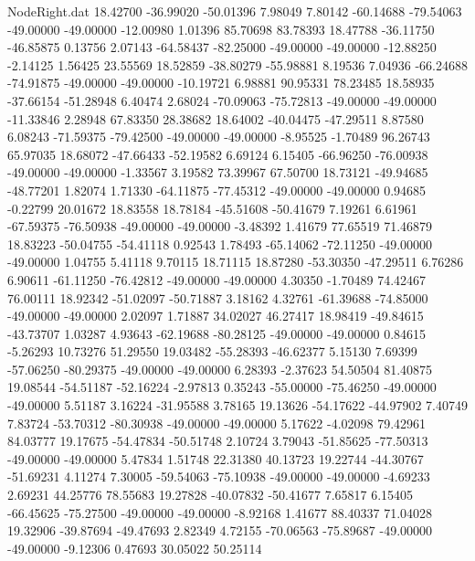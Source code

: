 \begin{filecontents}{NodeRight.dat}
  18.42700  -36.99020  -50.01396     7.98049    7.80142  -60.14688  -79.54063  -49.00000  -49.00000  -12.00980    1.01396   85.70698   83.78393
  18.47788  -36.11750  -46.85875     0.13756    2.07143  -64.58437  -82.25000  -49.00000  -49.00000  -12.88250   -2.14125    1.56425   23.55569
  18.52859  -38.80279  -55.98881     8.19536    7.04936  -66.24688  -74.91875  -49.00000  -49.00000  -10.19721    6.98881   90.95331   78.23485
  18.58935  -37.66154  -51.28948     6.40474    2.68024  -70.09063  -75.72813  -49.00000  -49.00000  -11.33846    2.28948   67.83350   28.38682
  18.64002  -40.04475  -47.29511     8.87580    6.08243  -71.59375  -79.42500  -49.00000  -49.00000   -8.95525   -1.70489   96.26743   65.97035
  18.68072  -47.66433  -52.19582     6.69124    6.15405  -66.96250  -76.00938  -49.00000  -49.00000   -1.33567    3.19582   73.39967   67.50700
  18.73121  -49.94685  -48.77201     1.82074    1.71330  -64.11875  -77.45312  -49.00000  -49.00000    0.94685   -0.22799   20.01672   18.83558
  18.78184  -45.51608  -50.41679     7.19261    6.61961  -67.59375  -76.50938  -49.00000  -49.00000   -3.48392    1.41679   77.65519   71.46879
  18.83223  -50.04755  -54.41118     0.92543    1.78493  -65.14062  -72.11250  -49.00000  -49.00000    1.04755    5.41118    9.70115   18.71115
  18.87280  -53.30350  -47.29511     6.76286    6.90611  -61.11250  -76.42812  -49.00000  -49.00000    4.30350   -1.70489   74.42467   76.00111
  18.92342  -51.02097  -50.71887     3.18162    4.32761  -61.39688  -74.85000  -49.00000  -49.00000    2.02097    1.71887   34.02027   46.27417
  18.98419  -49.84615  -43.73707     1.03287    4.93643  -62.19688  -80.28125  -49.00000  -49.00000    0.84615   -5.26293   10.73276   51.29550
  19.03482  -55.28393  -46.62377     5.15130    7.69399  -57.06250  -80.29375  -49.00000  -49.00000    6.28393   -2.37623   54.50504   81.40875
  19.08544  -54.51187  -52.16224    -2.97813    0.35243  -55.00000  -75.46250  -49.00000  -49.00000    5.51187    3.16224  -31.95588    3.78165
  19.13626  -54.17622  -44.97902     7.40749    7.83724  -53.70312  -80.30938  -49.00000  -49.00000    5.17622   -4.02098   79.42961   84.03777
  19.17675  -54.47834  -50.51748     2.10724    3.79043  -51.85625  -77.50313  -49.00000  -49.00000    5.47834    1.51748   22.31380   40.13723
  19.22744  -44.30767  -51.69231     4.11274    7.30005  -59.54063  -75.10938  -49.00000  -49.00000   -4.69233    2.69231   44.25776   78.55683
  19.27828  -40.07832  -50.41677     7.65817    6.15405  -66.45625  -75.27500  -49.00000  -49.00000   -8.92168    1.41677   88.40337   71.04028
  19.32906  -39.87694  -49.47693     2.82349    4.72155  -70.06563  -75.89687  -49.00000  -49.00000   -9.12306    0.47693   30.05022   50.25114

\end{filecontents}
